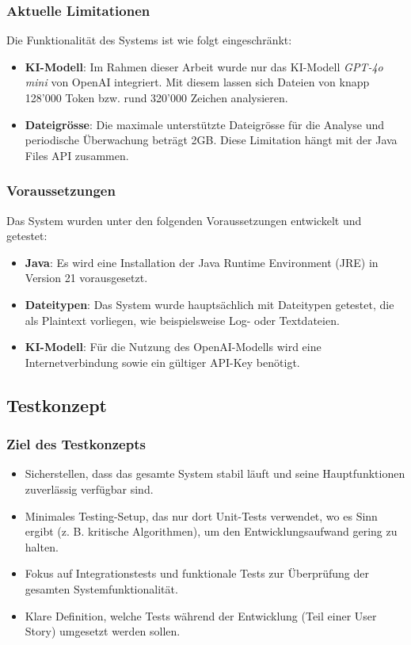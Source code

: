 \documentclass[a4paper,12pt]{report}
\begin{document}
    \subsubsection{Aktuelle Limitationen}
    Die Funktionalität des Systems ist wie folgt eingeschränkt:
    \begin{itemize}
        \item \textbf{KI-Modell}: Im Rahmen dieser Arbeit wurde nur das KI-Modell \textit{GPT-4o mini} von OpenAI integriert.
        Mit diesem lassen sich Dateien von knapp 128'000 Token bzw. rund 320'000 Zeichen analysieren.
        \item \textbf{Dateigrösse}: Die maximale unterstützte Dateigrösse für die Analyse und periodische Überwachung beträgt 2GB.
        Diese Limitation hängt mit der Java Files API zusammen.
    \end{itemize}

    \subsubsection{Voraussetzungen}
    Das System wurden unter den folgenden Voraussetzungen entwickelt und getestet:
    \begin{itemize}
        \item \textbf{Java}: Es wird eine Installation der Java Runtime Environment (JRE) in Version 21 vorausgesetzt.
        \item \textbf{Dateitypen}: Das System wurde hauptsächlich mit Dateitypen getestet, die als Plaintext vorliegen, wie beispielsweise Log- oder Textdateien.
        \item \textbf{KI-Modell}: Für die Nutzung des OpenAI-Modells wird eine Internetverbindung sowie ein gültiger API-Key benötigt.
    \end{itemize}

    \clearpage

    \subsection{Testkonzept}

    \subsubsection{Ziel des Testkonzepts}
    \begin{itemize}
        \item Sicherstellen, dass das gesamte System stabil läuft und seine Hauptfunktionen zuverlässig verfügbar sind.
        \item Minimales Testing-Setup, das nur dort Unit-Tests verwendet, wo es Sinn ergibt (z. B. kritische Algorithmen), um den Entwicklungsaufwand gering zu halten.
        \item Fokus auf Integrationstests und funktionale Tests zur Überprüfung der gesamten Systemfunktionalität.
        \item Klare Definition, welche Tests während der Entwicklung (Teil einer User Story) umgesetzt werden sollen.
    \end{itemize}
\end{document}
